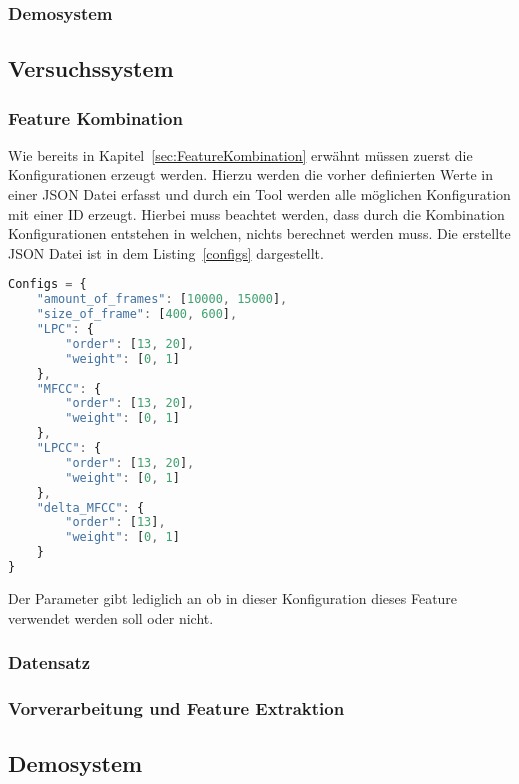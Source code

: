 \subsubsection{Demosystem}

\subsection{Versuchssystem}

\subsubsection{Feature Kombination}
Wie bereits in Kapitel~\ref{sec:FeatureKombination} erwähnt müssen zuerst die Konfigurationen erzeugt werden.
Hierzu werden die vorher definierten Werte in einer JSON Datei erfasst und durch ein Tool werden alle möglichen Konfiguration mit einer ID erzeugt.
Hierbei muss beachtet werden, dass durch die Kombination Konfigurationen entstehen in welchen, nichts berechnet werden muss.
Die erstellte JSON Datei ist in dem Listing~\ref{configs} dargestellt.
\begin{lstlisting}[language=JavaScript,numbers=none,caption=Konfigurationsmöglichkeiten,label=configs]
Configs = {
    "amount_of_frames": [10000, 15000],
    "size_of_frame": [400, 600],
    "LPC": {
        "order": [13, 20],
        "weight": [0, 1]
    },
    "MFCC": {
        "order": [13, 20],
        "weight": [0, 1]
    },
    "LPCC": {
        "order": [13, 20],
        "weight": [0, 1]
    },
    "delta_MFCC": {
        "order": [13],
        "weight": [0, 1]
    }
}
\end{lstlisting}
Der  Parameter gibt lediglich an ob in dieser Konfiguration dieses Feature verwendet werden soll oder nicht.

\subsubsection{Datensatz}



\subsubsection{Vorverarbeitung und Feature Extraktion}

\subsection{Demosystem}